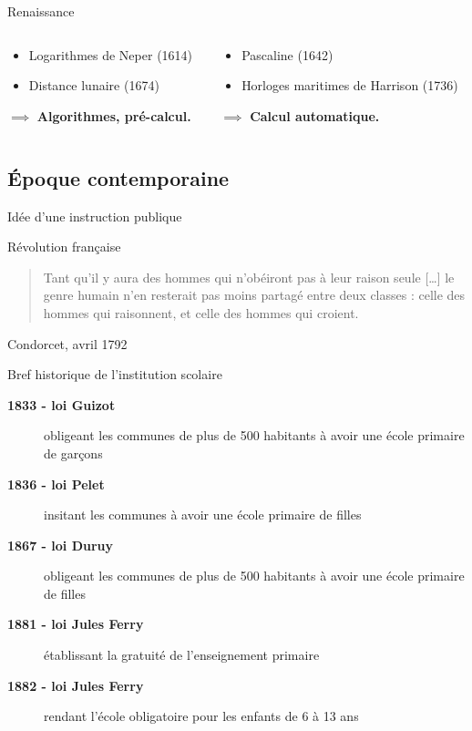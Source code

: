 \begin{frame}{Renaissance}
\begin{columns}
\begin{column}{0.40\linewidth}
	\end{column}
\end{columns}
\begin{columns}
	\begin{column}{0.49\linewidth}
		\begin{itemize}
			\item Logarithmes de Neper (1614)
			\item Distance lunaire (1674)
		\end{itemize}
		$\implies$ \textbf{Algorithmes, pré-calcul.}
	\end{column}
	\begin{column}{0.49\linewidth}
		\begin{itemize}
			\item Pascaline (1642)
			\item Horloges maritimes de Harrison (1736)
		\end{itemize}
		$\implies$ \textbf{Calcul automatique.}
	\end{column}
\end{columns}
\end{frame}

\subsection{Époque contemporaine}

\begin{frame}{Idée d'une instruction publique}

Révolution française

\begin{quote}
Tant qu'il y aura des hommes qui n'obéiront pas à leur raison seule [\ldots] le genre humain n'en resterait pas moins partagé entre deux classes : celle des hommes qui raisonnent, et celle 
des hommes qui croient.
\end{quote}
Condorcet, avril 1792

\end{frame}

\begin{frame}{Bref historique de l'institution scolaire}
\begin{description}
\item[\bf 1833 - loi Guizot] obligeant les communes de plus de 500 habitants à avoir une école primaire de garçons
\item[\bf 1836 - loi Pelet] insitant les communes à avoir une école primaire de filles
\item[\bf 1867 - loi Duruy] obligeant les communes de plus de 500 habitants à avoir une école primaire de filles
\item[\bf 1881 - loi Jules Ferry] établissant la gratuité de l'enseignement primaire
\item[\bf 1882 - loi Jules Ferry] rendant l'école obligatoire pour les enfants de 6 à 13 ans
\end{description}

\end{frame}

